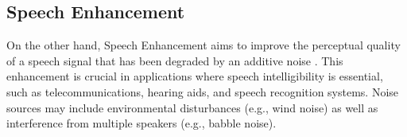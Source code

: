 \documentclass[logo,bsc,singlespacing,parskip,online]{infthesis}
\begin{document}

\subsection{Speech Enhancement}
On the other hand, Speech Enhancement aims to improve the perceptual quality of a speech signal that 
has been degraded by an additive noise \cite{loizou_speech_2007}. 
This enhancement is crucial in applications where speech intelligibility is essential, such as telecommunications, hearing aids, and speech recognition systems. Noise sources may include environmental disturbances (e.g., wind noise) as well as interference from multiple speakers (e.g., babble noise).
\end{document}
